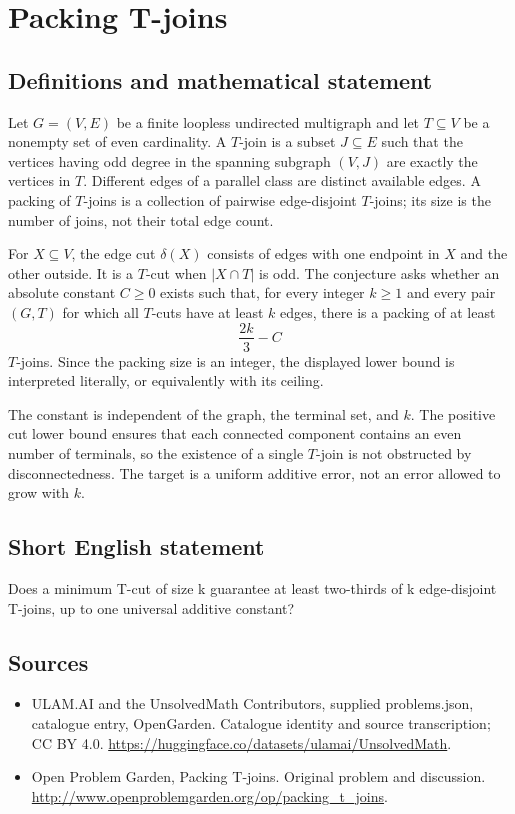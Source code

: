 \documentclass[11pt,a4paper]{article}
\begin{document}
\section*{Packing T-joins}\label{statement}

\subsection{Definitions and mathematical statement}
Let $G=(V,E)$ be a finite loopless undirected multigraph and let $T\subseteq V$ be a nonempty set of even cardinality. A $T$-join is a subset $J\subseteq E$ such that the vertices having odd degree in the spanning subgraph $(V,J)$ are exactly the vertices in $T$. Different edges of a parallel class are distinct available edges. A packing of $T$-joins is a collection of pairwise edge-disjoint $T$-joins; its size is the number of joins, not their total edge count.

For $X\subseteq V$, the edge cut $\delta(X)$ consists of edges with one endpoint in $X$ and the other outside. It is a $T$-cut when $|X\cap T|$ is odd. The conjecture asks whether an absolute constant $C\ge0$ exists such that, for every integer $k\ge1$ and every pair $(G,T)$ for which all $T$-cuts have at least $k$ edges, there is a packing of at least
\[
                         \frac{2k}{3}-C
\]
$T$-joins. Since the packing size is an integer, the displayed lower bound is interpreted literally, or equivalently with its ceiling.

The constant is independent of the graph, the terminal set, and $k$. The positive cut lower bound ensures that each connected component contains an even number of terminals, so the existence of a single $T$-join is not obstructed by disconnectedness. The target is a uniform additive error, not an error allowed to grow with $k$.
\subsection{Short English statement}
Does a minimum T-cut of size k guarantee at least two-thirds of k edge-disjoint T-joins, up to one universal additive constant?
\subsection{Sources}
\begin{itemize}
\item[S1] ULAM.AI and the UnsolvedMath Contributors, supplied problems.json, catalogue entry, OpenGarden. Catalogue identity and source transcription; CC BY 4.0.
\url{https://huggingface.co/datasets/ulamai/UnsolvedMath}.
\item[S2] Open Problem Garden, Packing T-joins. Original problem and discussion.
\url{http://www.openproblemgarden.org/op/packing_t_joins}.
\end{itemize}
\end{document}
